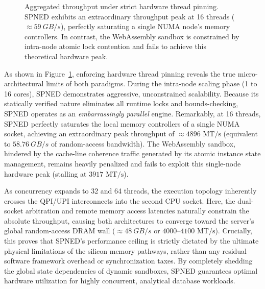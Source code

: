 \documentclass[onecolumn]{IEEEtran}
\numberwithin{equation}{section}
\theoremstyle{definition}
\theoremstyle{remark}
\begin{document}
\begin{figure}[htbp]
\centering
{}
\caption{Aggregated throughput under strict hardware thread pinning. SPNED exhibits an extraordinary throughput peak at 16 threads ($\approx \SI{59}{GB/s}$), perfectly saturating a single NUMA node's memory controllers. In contrast, the WebAssembly sandbox is constrained by intra-node atomic lock contention and fails to achieve this theoretical hardware peak.}
\label{fig:scalability}
\end{figure}

As shown in Figure~\ref{fig:scalability}, enforcing hardware thread pinning reveals the true micro-architectural limits of both paradigms. During the intra-node scaling phase (1 to 16 cores), SPNED demonstrates aggressive, unconstrained scalability. Because its statically verified nature eliminates all runtime locks and bounds-checking, SPNED operates as an \textit{embarrassingly parallel} engine. Remarkably, at 16 threads, SPNED perfectly saturates the local memory controllers of a single NUMA socket, achieving an extraordinary peak throughput of $\approx 4896 \text{ MT/s}$ (equivalent to $\SI{58.76}{GB/s}$ of random-access bandwidth). The WebAssembly sandbox, hindered by the cache-line coherence traffic generated by its atomic instance state management, remains heavily penalized and fails to exploit this single-node hardware peak (stalling at $3917 \text{ MT/s}$).

As concurrency expands to 32 and 64 threads, the execution topology inherently crosses the QPI/UPI interconnects into the second CPU socket. Here, the dual-socket arbitration and remote memory access latencies naturally constrain the absolute throughput, causing both architectures to converge toward the server's global random-access DRAM wall ($\approx \SI{48}{GB/s}$ or $4000\text{--}4100 \text{ MT/s}$). Crucially, this proves that SPNED's performance ceiling is strictly dictated by the ultimate physical limitations of the silicon memory pathways, rather than any residual software framework overhead or synchronization taxes. By completely shedding the global state dependencies of dynamic sandboxes, SPNED guarantees optimal hardware utilization for highly concurrent, analytical database workloads.
\end{document}
